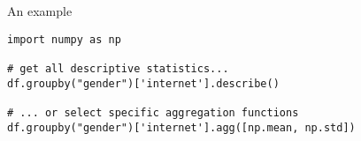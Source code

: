 \begin{frame}[fragile]{An example}
\begin{verbatim}
import numpy as np

# get all descriptive statistics...
df.groupby("gender")['internet'].describe()

# ... or select specific aggregation functions
df.groupby("gender")['internet'].agg([np.mean, np.std])
\end{verbatim}


\end{frame}

